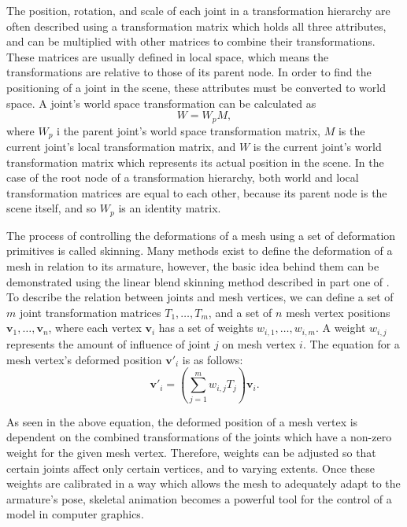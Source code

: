 The position, rotation, and scale of each joint in a transformation hierarchy
are often described using a transformation matrix which holds all three
attributes, and can be multiplied with other matrices to combine their
transformations. These matrices are usually defined in local space, which means
the transformations are relative to those of its parent node. In order to find
the positioning of a joint in the scene, these attributes must be converted to
world space. A joint's world space transformation can be calculated as
\begin{equation}
    W = W_p M, 
\end{equation}
where \(W_p\) i the parent joint's world space transformation matrix, \(M\) is
the current joint's local transformation matrix, and \(W\) is the current
joint's world transformation matrix which represents its actual position in the
scene. In the case of the root node of a transformation hierarchy, both world
and local transformation matrices are equal to each other, because its parent
node is the scene itself, and so \(W_p\) is an identity matrix.

The process of controlling the deformations of a mesh using a set of deformation
primitives is called skinning. Many methods exist to define the deformation of
a mesh in relation to its armature, however, the basic idea behind them can be
demonstrated using the linear blend skinning method described in part one of
\cite{skinning}. To describe the relation between joints and mesh vertices, we
can define a set of \(m\) joint transformation matrices \(T_1, \dots, T_m\), and
a set of \(n\) mesh vertex positions \(\mathbf{v}_1, \dots, \mathbf{v}_n\),
where each vertex \(\mathbf{v}_i\) has a set of weights \(w_{i,1}, \dots,
w_{i,m}\). A weight \(w_{i,j}\) represents the amount of influence of joint
\(j\) on mesh vertex \(i\). The equation for a mesh vertex's deformed position
\(\mathbf{v'}_i\) is as follows:
\begin{equation}
    \mathbf{v'}_i = \left(\sum_{j=1}^m w_{i,j} T_j \right) \mathbf{v}_i.
\end{equation}

As seen in the above equation, the deformed position of a mesh vertex is
dependent on the combined transformations of the joints which have a non-zero
weight for the given mesh vertex. Therefore, weights can be adjusted so that certain
joints affect only certain vertices, and to varying extents. Once these weights are
calibrated in a way which allows the mesh to adequately adapt to the armature's
pose, skeletal animation becomes a powerful tool for the control of a model in
computer graphics.


